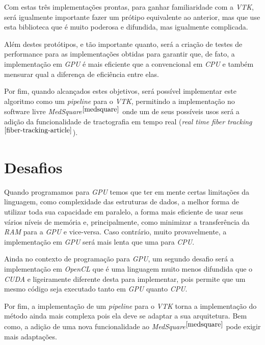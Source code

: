 Com estas três implementações prontas, para ganhar familiaridade com a \textit{VTK}, será igualmente importante fazer um prótipo equivalente ao anterior, mas que use esta biblioteca que é muito poderosa e difundida, mas igualmente complicada.

Além destes protótipos, e tão importante quanto, será a criação de testes de performance para as implementações obtidas para garantir que, de fato, a implementação em \textit{GPU} é mais eficiente que a convencional em \textit{CPU} e também mensurar qual a diferença de eficiência entre elas.

Por fim, quando alcançados estes objetivos, será possível implementar este algoritmo como um \textit{pipeline} para o \textit{VTK}, permitindo a implementação no software livre \textit{MedSquare}$^{\ref{medsquare}}$ onde um de seus possíveis usos será a adição da funcionalidade de tractografia em tempo real (\textit{real time fiber tracking}$^{\ref{fiber-tracking-article}}$).

\section{Desafios}
Quando programamos para \textit{GPU} temos que ter em mente certas limitações da linguagem, como complexidade das estruturas de dados, a melhor forma de utilizar toda sua capacidade em paralelo, a forma mais eficiente de usar seus vários níveis de memória e, principalmente, como minimizar a transferência da \textit{RAM} para a \textit{GPU} e vice-versa. Caso contrário, muito provavelmente, a implementação em \textit{GPU} será mais lenta que uma para \textit{CPU}.

Ainda no contexto de programação para \textit{GPU}, um segundo desafio será a implementação em \textit{OpenCL} que é uma linguagem muito menos difundida que o \textit{CUDA} e ligeiramente diferente desta para implementar, pois permite que um mesmo código seja executado tanto em \textit{GPU} quanto \textit{CPU}.

Por fim, a implementação de um \textit{pipeline} para o \textit{VTK} torna a implementação do método ainda mais complexa pois ela deve se adaptar a sua arquitetura. Bem como, a adição de uma nova funcionalidade ao \textit{MedSquare}$^{\ref{medsquare}}$ pode exigir mais adaptações.
